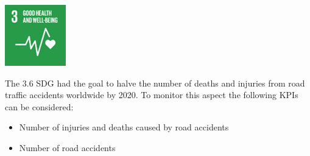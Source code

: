 \begin{minipage}[c]{0.2\textwidth}
    \includegraphics[width=\textwidth]{Images/Social_sustainability/3_helth.png}
\end{minipage}
\begin{minipage}[c]{0.8\textwidth}
    The 3.6 SDG had the goal to halve the number of deaths and injuries from road traffic accidents worldwide by 2020. To monitor this aspect the following KPIs can be considered:
\begin{itemize}
    \item Number of injuries and deaths caused by road accidents
    \item Number of road accidents
\end{itemize}
\end{minipage}
\hfill

